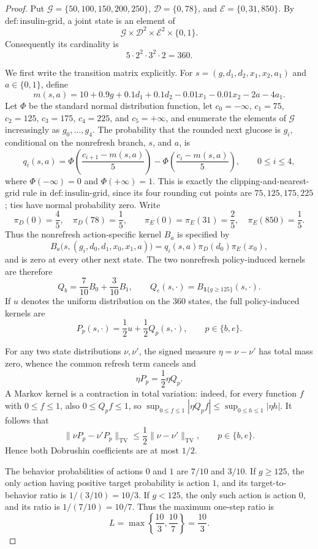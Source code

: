 \documentclass{article}
\begin{document}
\begin{proof}
Put \(\mathcal G=\{50,100,150,200,250\}\), \(\mathcal D=\{0,78\}\), and \(\mathcal E=\{0,31,850\}\).  By \(\mathrm{def{:}insulin\text{-}grid}\), a joint state is an element of
\[
 \mathcal G\times\mathcal D^2\times\mathcal E^2\times\{0,1\}.
\]
Consequently its cardinality is
\[
 5\cdot 2^2\cdot 3^2\cdot 2=360.
\]

We first write the transition matrix explicitly.  For
\(s=(g,d_1,d_2,x_1,x_2,a_1)\) and \(a\in\{0,1\}\), define
\[
 m(s,a)=10+0.9g+0.1d_1+0.1d_2-0.01x_1-0.01x_2-2a-4a_1.
\]
Let \(\Phi\) be the standard normal distribution function, let
\(c_0=-\infty\), \(c_1=75\), \(c_2=125\), \(c_3=175\),
\(c_4=225\), and \(c_5=+\infty\), and enumerate the elements of
\(\mathcal G\) increasingly as \(g_0,\ldots,g_4\).  The probability
that the rounded next glucose is \(g_i\), conditional on the
nonrefresh branch, \(s\), and \(a\), is
\[
 q_i(s,a)=\Phi\!\left(\frac{c_{i+1}-m(s,a)}5\right)
             -\Phi\!\left(\frac{c_i-m(s,a)}5\right),
 \qquad 0\le i\le4,
\]
where \(\Phi(-\infty)=0\) and \(\Phi(+\infty)=1\).  This is exactly
the clipping-and-nearest-grid rule in \(\mathrm{def{:}insulin\text{-}grid}\),
since its four rounding cut points are \(75,125,175,225\); ties have
normal probability zero.  Write
\[
 \pi_D(0)=\frac45,\quad \pi_D(78)=\frac15,
 \qquad
 \pi_E(0)=\pi_E(31)=\frac25,\quad \pi_E(850)=\frac15.
\]
Thus the nonrefresh action-specific kernel \(B_a\) is specified by
\[
 B_a\bigl(s,(g_i,d_0,d_1,x_0,x_1,a)\bigr)
   =q_i(s,a)\pi_D(d_0)\pi_E(x_0),
\]
and is zero at every other next state.  The two nonrefresh
policy-induced kernels are therefore
\[
 Q_b=\frac7{10}B_0+\frac3{10}B_1,
 \qquad
 Q_e(s,\cdot)=B_{\mathbf 1\{g\ge125\}}(s,\cdot).
\]
If \(u\) denotes the uniform distribution on the \(360\) states, the
full policy-induced kernels are
\[
 P_p(s,\cdot)=\frac12u+\frac12Q_p(s,\cdot),
 \qquad p\in\{b,e\}.
\]

For any two state distributions \(\nu,\nu'\), the signed measure
\(\eta=\nu-\nu'\) has total mass zero, whence the common refresh term
cancels and
\[
 \eta P_p=\frac12\eta Q_p.
\]
A Markov kernel is a contraction in total variation: indeed, for
every function \(f\) with \(0\le f\le1\), also \(0\le Q_pf\le1\), so
\(\sup_{0\le f\le1}|\eta Q_pf|\le\sup_{0\le h\le1}|\eta h|\).
It follows that
\[
 \|\nu P_p-\nu'P_p\|_{\mathrm{TV}}
 \le\frac12\|\nu-\nu'\|_{\mathrm{TV}},
 \qquad p\in\{b,e\}.
\]
Hence both Dobrushin coefficients are at most \(1/2\).

The behavior probabilities of actions \(0\) and \(1\) are \(7/10\)
and \(3/10\).  If \(g\ge125\), the only action having positive target
probability is action \(1\), and its target-to-behavior ratio is
\(1/(3/10)=10/3\).  If \(g<125\), the only such action is action
\(0\), and its ratio is \(1/(7/10)=10/7\).  Thus the maximum one-step
ratio is
\[
 L=\max\left\{\frac{10}{3},\frac{10}{7}\right\}=\frac{10}{3}.
\]


\end{proof}
\end{document}
